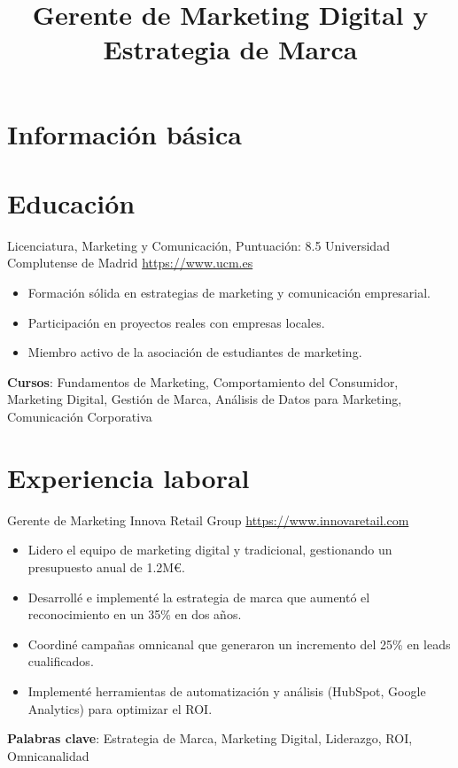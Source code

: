 \documentclass[a4paper, serif, 10pt]{moderncv}
\title{Gerente de Marketing Digital y Estrategia de Marca}
\begin{document}
\maketitle

\section{Información básica}

\section{Educación}

        {Licenciatura, Marketing y Comunicación, Puntuación: 8.5}
        {Universidad Complutense de Madrid}
        {\url{https://www.ucm.es}}
        {}
        {\begin{itemize}
\item Formación sólida en estrategias de marketing y comunicación empresarial.
\item Participación en proyectos reales con empresas locales.
\item Miembro activo de la asociación de estudiantes de marketing.
\end{itemize}
\textbf{Cursos}: Fundamentos de Marketing, Comportamiento del Consumidor, Marketing Digital, Gestión de Marca, Análisis de Datos para Marketing, Comunicación Corporativa}
\section{Experiencia laboral}

        {Gerente de Marketing}
        {Innova Retail Group}
        {\url{https://www.innovaretail.com}}
        {}
        {\begin{itemize}
\item Lidero el equipo de marketing digital y tradicional, gestionando un presupuesto anual de 1.2M€.
\item Desarrollé e implementé la estrategia de marca que aumentó el reconocimiento en un 35\% en dos años.
\item Coordiné campañas omnicanal que generaron un incremento del 25\% en leads cualificados.
\item Implementé herramientas de automatización y análisis (HubSpot, Google Analytics) para optimizar el ROI.
\end{itemize}
\textbf{Palabras clave}: Estrategia de Marca, Marketing Digital, Liderazgo, ROI, Omnicanalidad}
\end{document}
